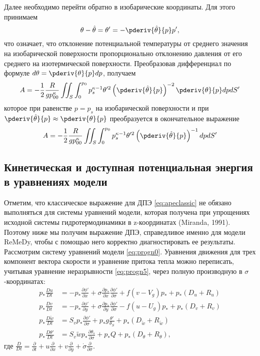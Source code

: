 Далее необходимо перейти обратно в изобарические координаты. Для этого принимаем
\begin{equation}
\theta - \hat{\theta}=\theta'=-\pderiv{\hat{\theta}}{p}p',
\end{equation}
что означает, что отклонение потенциальной температуры от среднего значения на изобарической поверхности пропорционально отклонению давления от его среднего на изотермической поверхности. 
Преобразовав дифференциал по формуле $d\theta=\pderiv{\theta}{p}dp$, получаем
\begin{equation}
A=-\frac{1}{2}\frac{R}{gp_{00}^\kappa}\iint_S\int_0^{p_0}p_s^{\kappa-1}\theta'^2\left(\pderiv{\hat{\theta}}{p}\right)^{-2}\pderiv{\theta}{p} dp dS'
\end{equation}
которое при равенстве $p=p_s$ на изобарической поверхности и при $\pderiv{\hat{\theta}}{p}\approx \pderiv{\theta}{p}$ преобразуется в окончательное выражение
\begin{equation} \label{eq:apeclassic}
A=-\frac{1}{2}\frac{R}{gp_{00}^\kappa}\iint_S\int_0^{p_0}p_s^{\kappa-1}\theta'^2\left(\pderiv{\hat{\theta}}{p}\right)^{-1} dp dS'
\end{equation}

\subsection{Кинетическая и доступная потенциальная энергия в уравнениях модели}
\label{sec:energymodel}
Отметим, что классическое выражение для ДПЭ \eqref{eq:apeclassic} не обязано выполняться для системы уравнений модели, которая получена при упрощениях исходной системы гидротермодинамики в z-координатах (Miranda, 1991). Поэтому ниже мы получим выражение ДПЭ, справедливое именно для модели ReMeDy, чтобы с помощью него корректно диагностировать ее результаты. Рассмотрим систему уравнений модели \eqref{eq:progn0}. Уравнения движения для трех компонент вектора скорости и уравнение притока тепла можно переписать, учитывая уравнение неразрывности \eqref{eq:progn5}, через полную производную в $\sigma$-координатах:
\begin{subequations}\label{eq:totderiv0}
\begin{align}
p_*\frac{Du}{Dt}&=-p_* \frac{\partial{\phi'}}{\partial{x}}+\sigma \frac{\partial{p_*}}{\partial{x}}\frac{\partial{\phi'}}{\partial{\sigma}}+f(v-V_g )p_*+p_*(D_u+R_u )\label{eq:totderiv1} \\
p_*\frac{Dv}{Dt}&=-p_* \frac{\partial{\phi'}}{\partial{y}}+\sigma \frac{\partial{p_*}}{\partial{y}}\frac{\partial{\phi'}}{\partial{\sigma}}-f(u-U_g )p_*+p_*(D_v+R_v )\label{eq:totderiv2} \\
p_*\frac{D\tilde{w}}{Dt}&=S_vp_* \frac{\partial{\phi'}}{\partial{\sigma}}+p_*g\frac{\theta'}{\theta_S}+p_*(D_{\tilde{w}}+R_{\tilde{w}})\label{eq:totderiv3} \\
p_*\frac{D\theta'}{Dt}&=S_v\tilde{w}p_*\frac{\partial{\theta_s}}{\partial{\sigma}}+p_*Q+p_*(D_{\theta}+R_{\theta}),\label{eq:totderiv4} 
\end{align}
\end{subequations}
где $\frac{D}{Dt}=\frac{\partial}{\partial{t}} +u \frac{\partial}{\partial{x}}+ v\frac{\partial}{\partial{y}}+ \dot{\sigma}\frac{\partial}{\partial{\sigma}}$.

